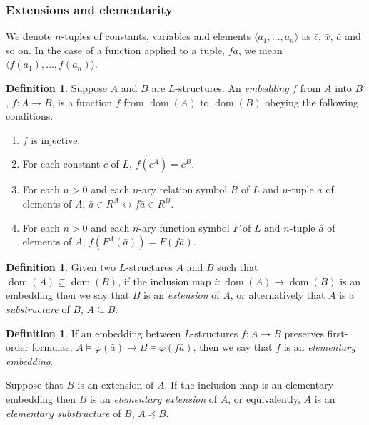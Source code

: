 \documentclass[10pt, a4paper, oneside]{article}
\theoremstyle{definition}
\newtheorem{dfn}[thm]{Definition}
\theoremstyle{remark}
\theoremstyle{plain}
\theoremstyle{plain}
\DeclareMathOperator{\dom}{dom}
\begin{document}
\subsubsection{Extensions and elementarity}

We denote $n$-tuples of constants, variables and elements $\langle a_1, \dotsc,
a_n \rangle$ as $\bar{c}$, $\bar{x}$, $\bar{a}$ and so on. In the case of a
function applied to a tuple, $f\bar{a}$, we mean $\langle f(a_1), \dotsc, f(a_n)
\rangle$.

\begin{dfn}
    Suppose $A$ and $B$ are $L$-structures. An \emph{embedding} $f$ from $A$
    into $B$, $f : A \rightarrow B$, is a function $f$ from $\dom(A)$ to
    $\dom(B)$ obeying the following conditions.
    
    \begin{enumerate}
        \item $f$ is injective.
        \item For each constant $c$ of $L$, $f(c^A) = c^B$.
        \item For each $n > 0$ and each $n$-ary relation symbol $R$ of $L$ and
              $n$-tuple $\bar{a}$ of elements of $A$, $\bar{a} \in R^A
              \leftrightarrow f\bar{a} \in R^B$.
        \item For each $n > 0$ and each $n$-ary function symbol $F$ of $L$ and
              $n$-tuple $\bar{a}$ of elements of $A$, $f(F^A(\bar{a})) =
              F(f\bar{a})$.
    \end{enumerate}
\end{dfn}

\begin{dfn}
    Given two $L$-structures $A$ and $B$ such that $\dom(A) \subseteq \dom(B)$,
    if the inclusion map $i : \dom(A) \rightarrow \dom(B)$ is an embedding then
    we say that $B$ is an \emph{extension} of $A$, or alternatively that $A$ is
    a \emph{substructure} of $B$, $A \subseteq B$.
\end{dfn}

\begin{dfn}
    If an embedding between $L$-structures $f : A \rightarrow B$ preserves
    first-order formulae, $A \models \varphi(\bar{a}) \rightarrow B \models
    \varphi(f\bar{a})$, then we say that $f$ is an \emph{elementary embedding}.
    
    Suppose that $B$ is an extension of $A$. If the inclusion map is an
    elementary embedding then $B$ is an \emph{elementary extension} of $A$, or
    equivalently, $A$ is an \emph{elementary substructure} of $B$, $A
    \preccurlyeq B$.
\end{dfn}
\end{document}
